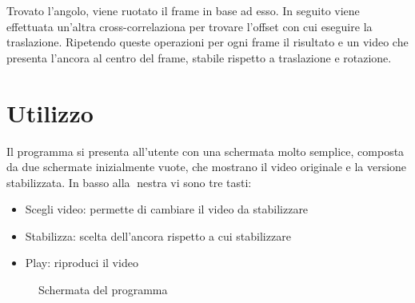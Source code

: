 \documentclass[12pt]{article}
\begin{document}
Trovato l'angolo, viene ruotato il frame in base ad esso. In seguito viene effettuata un'altra cross-correlaziona per trovare l'offset con cui eseguire la traslazione. Ripetendo queste operazioni per ogni frame il risultato e un video che presenta l'ancora al centro del frame, stabile rispetto a traslazione e rotazione.

\clearpage
\section{Utilizzo}
Il programma si presenta all'utente con una schermata molto semplice, composta da due
schermate inizialmente vuote, che mostrano il video originale e la versione stabilizzata.
In basso alla nestra vi sono tre tasti:
\begin{itemize}
	\item Scegli video: permette di cambiare il video da stabilizzare
	\item Stabilizza: scelta dell'ancora rispetto a cui stabilizzare
	\item Play: riproduci il video
\end{itemize}

\begin{figure}[h!]
	\begin{center}
	  \caption{Schermata del programma}
	\end{center}
\end{figure}
\end{document}
